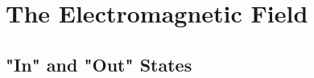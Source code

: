 \section{The Electromagnetic Field}\label{sec:chapter3}

\subsection{"In" and "Out" States}\label{susec:3_1}